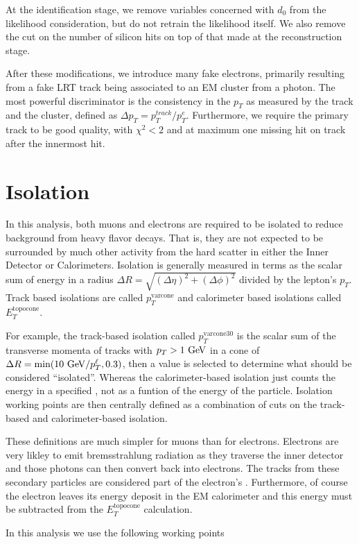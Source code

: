 At the identification stage, we remove variables concerned with $d_{0}$ from the likelihood consideration, but do not retrain the likelihood itself. We also remove the cut on the number of silicon hits on top of that made at the reconstruction stage. 

After these modifications, we introduce many fake electrons, primarily resulting from a fake \ac{LRT} track being associated to an \ac{EM} cluster from a photon. The most powerful discriminator is the consistency in the $p_{T}$ as measured by the track and the cluster, defined as $\Delta p_{T} = p_{T}^{track}/p_{T}^{e}$. Furthermore, we require the primary track to be good quality, with $\chi^{2} < 2$ and at maximum one missing hit on track after the innermost hit. 






\section{Isolation}

In this analysis, both muons and electrons are required to be isolated to reduce background from heavy flavor decays. That is, they are not expected to be surrounded by much other activity from the hard scatter in either the Inner Detector or Calorimeters. Isolation is generally measured in terms as the scalar sum of energy in a radius $\Delta R = \sqrt{(\Delta \eta)^2 + (\Delta \phi)^2}$ divided by the lepton's $p_{T}$. Track based isolations are called $p_{T}^{\textrm{varcone}}$ and calorimeter based isolations called $E_{T}^{\textrm{topocone}}$. 

For example, the track-based isolation called $p_{T}^{\textrm{varcone30}}$ is the scalar sum of the transverse momenta of tracks with $p_{T} > 1 \GeV$ in a cone of $\Delta R = \textrm{min}(10 \GeV/p_{T}^{\ell}, 0.3)$, then a value is selected to determine what should be considered ``isolated''. Whereas the calorimeter-based isolation just counts the energy in a specified \dR, not as a funtion of the energy of the particle. Isolation working points are then centrally defined as a combination of cuts on the track-based and calorimeter-based isolation. 

These definitions are much simpler for muons than for electrons. Electrons are very likley to emit bremsstrahlung radiation as they traverse the inner detector and those photons can then convert back into electrons. The tracks from these secondary particles are considered part of the electron's \pT. Furthermore, of course the electron leaves its energy deposit in the \ac{EM} calorimeter and this energy must be subtracted from the $E_{T}^{\textrm{topocone}}$ calculation.


In this analysis we use the following working points



